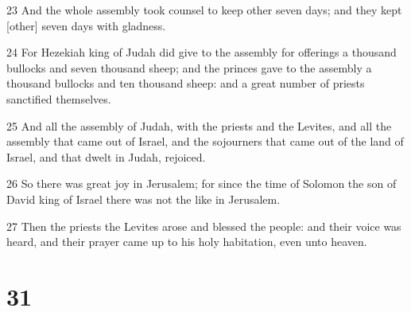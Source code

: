 \par 23 And the whole assembly took counsel to keep other seven days; and they kept [other] seven days with gladness.
\par 24 For Hezekiah king of Judah did give to the assembly for offerings a thousand bullocks and seven thousand sheep; and the princes gave to the assembly a thousand bullocks and ten thousand sheep: and a great number of priests sanctified themselves.
\par 25 And all the assembly of Judah, with the priests and the Levites, and all the assembly that came out of Israel, and the sojourners that came out of the land of Israel, and that dwelt in Judah, rejoiced.
\par 26 So there was great joy in Jerusalem; for since the time of Solomon the son of David king of Israel there was not the like in Jerusalem.
\par 27 Then the priests the Levites arose and blessed the people: and their voice was heard, and their prayer came up to his holy habitation, even unto heaven.

\chapter{31}

